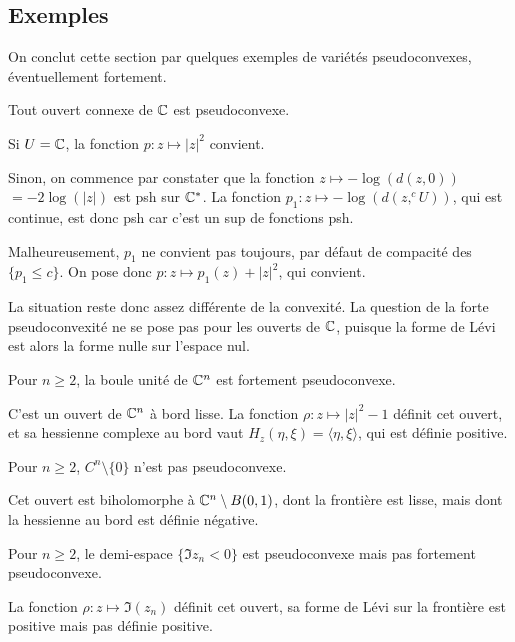 \subsection{Exemples}
On conclut cette section par quelques exemples de variétés pseudoconvexes, éventuellement fortement.
\begin{exemple}
  Tout ouvert connexe de $\mathbb{C}$ est pseudoconvexe.
\end{exemple}
\begin{preuve}
Si $U=\mathbb{C}$, la fonction $p: z \mapsto |z|^2$ convient.

Sinon, on commence par constater que la fonction $z \mapsto
-\log(d(z,0))$ $= -2\log(|z|)$ est psh sur $\mathbb{C}^*$. La fonction $p_1 : z \mapsto -\log(d(z,^cU))$, qui est continue, est donc psh car c'est un sup de fonctions psh.

Malheureusement, $p_1$ ne convient pas toujours, par défaut de compacité des $\{p_1 \leq c\}$. On pose donc $p: z \mapsto p_1(z)+|z|^2$, qui convient.
\end{preuve}
La situation reste donc assez différente de la convexité. La question de la forte pseudoconvexité ne se pose pas pour les ouverts de $\mathbb{C}$, puisque la forme de Lévi est alors la forme nulle sur l'espace nul.
\begin{exemple}
Pour $n \geq 2$, la boule unité de $\mathbb{C}^n$ est fortement pseudoconvexe.
\end{exemple}
\begin{preuve}
C'est un ouvert de $\mathbb{C}^n$ à bord lisse. La fonction $\rho : z \mapsto |z|^2-1$ définit cet ouvert, et sa hessienne complexe au bord vaut $H_z(\eta,\xi) = \langle \eta,\xi \rangle$, qui est définie positive.
\end{preuve}
\begin{exemple}
Pour $n \geq 2$, $C^n \setminus \{0\}$ n'est pas pseudoconvexe.
\end{exemple}
\begin{preuve}
Cet ouvert est biholomorphe à $\mathbb{C}^n \setminus B(0,1)$, dont la frontière est lisse, mais dont la hessienne au bord est définie négative.
\end{preuve}
\begin{exemple}
Pour $n \geq 2$, le demi-espace $\{\Im z_n <0\}$ est pseudoconvexe mais pas fortement pseudoconvexe.
\end{exemple}
\begin{preuve}
La fonction $\rho: z \mapsto \Im(z_n)$ définit cet ouvert, sa forme de Lévi sur la frontière est positive mais pas définie positive.
\end{preuve}


